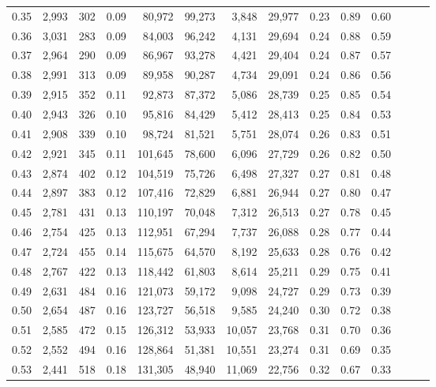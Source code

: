 \begin{tabular}{rrrrrrrrrrrrrr}
0.35 &  2,993 &  302 &  0.09 &   80,972 &   99,273 &   3,848 &  29,977 &  0.23 &  0.89 &      0.60 \\
0.36 &  3,031 &  283 &  0.09 &   84,003 &   96,242 &   4,131 &  29,694 &  0.24 &  0.88 &      0.59 \\
0.37 &  2,964 &  290 &  0.09 &   86,967 &   93,278 &   4,421 &  29,404 &  0.24 &  0.87 &      0.57 \\
0.38 &  2,991 &  313 &  0.09 &   89,958 &   90,287 &   4,734 &  29,091 &  0.24 &  0.86 &      0.56 \\
0.39 &  2,915 &  352 &  0.11 &   92,873 &   87,372 &   5,086 &  28,739 &  0.25 &  0.85 &      0.54 \\
0.40 &  2,943 &  326 &  0.10 &   95,816 &   84,429 &   5,412 &  28,413 &  0.25 &  0.84 &      0.53 \\
0.41 &  2,908 &  339 &  0.10 &   98,724 &   81,521 &   5,751 &  28,074 &  0.26 &  0.83 &      0.51 \\
0.42 &  2,921 &  345 &  0.11 &  101,645 &   78,600 &   6,096 &  27,729 &  0.26 &  0.82 &      0.50 \\
0.43 &  2,874 &  402 &  0.12 &  104,519 &   75,726 &   6,498 &  27,327 &  0.27 &  0.81 &      0.48 \\
0.44 &  2,897 &  383 &  0.12 &  107,416 &   72,829 &   6,881 &  26,944 &  0.27 &  0.80 &      0.47 \\
0.45 &  2,781 &  431 &  0.13 &  110,197 &   70,048 &   7,312 &  26,513 &  0.27 &  0.78 &      0.45 \\
0.46 &  2,754 &  425 &  0.13 &  112,951 &   67,294 &   7,737 &  26,088 &  0.28 &  0.77 &      0.44 \\
0.47 &  2,724 &  455 &  0.14 &  115,675 &   64,570 &   8,192 &  25,633 &  0.28 &  0.76 &      0.42 \\
0.48 &  2,767 &  422 &  0.13 &  118,442 &   61,803 &   8,614 &  25,211 &  0.29 &  0.75 &      0.41 \\
0.49 &  2,631 &  484 &  0.16 &  121,073 &   59,172 &   9,098 &  24,727 &  0.29 &  0.73 &      0.39 \\
0.50 &  2,654 &  487 &  0.16 &  123,727 &   56,518 &   9,585 &  24,240 &  0.30 &  0.72 &      0.38 \\
0.51 &  2,585 &  472 &  0.15 &  126,312 &   53,933 &  10,057 &  23,768 &  0.31 &  0.70 &      0.36 \\
0.52 &  2,552 &  494 &  0.16 &  128,864 &   51,381 &  10,551 &  23,274 &  0.31 &  0.69 &      0.35 \\
0.53 &  2,441 &  518 &  0.18 &  131,305 &   48,940 &  11,069 &  22,756 &  0.32 &  0.67 &      0.33 \\

\end{tabular}
